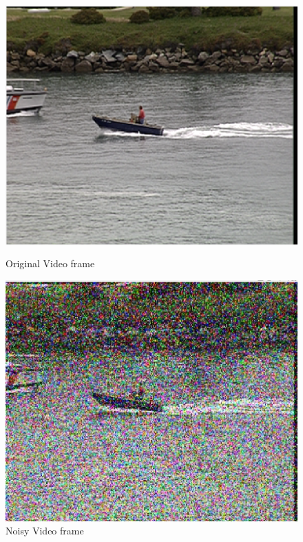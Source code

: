 \documentclass{article}
\begin{document}
\begin{figure}[H]
    \centering
    \begin{minipage}{.45\textwidth}
        \centering
        \includegraphics[width=\linewidth]{Images/Coastguard_original.png}
        \caption{Original Video frame}
        \label{fig:totalpowervst}
    \end{minipage}
    \begin{minipage}{.45\textwidth}
        \centering
        \includegraphics[width=\linewidth]{Images/Coastguard_1_noisy.png}
        \caption{Noisy Video frame}
    \end{minipage}
\end{figure}
\end{document}
